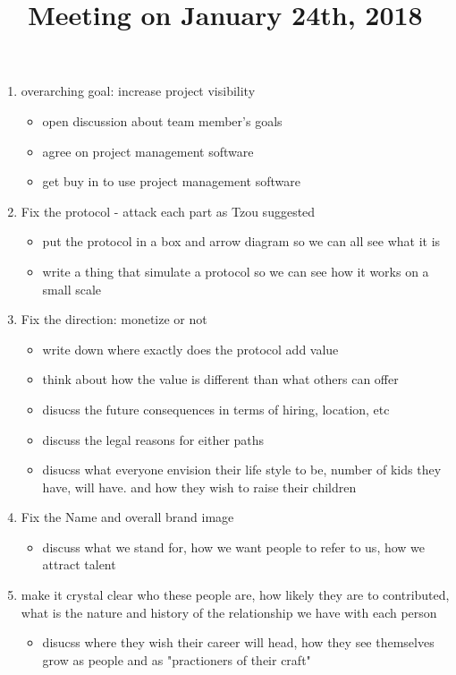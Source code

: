 \title{Meeting on January 24th, 2018}

\begin{enumerate}
	\item overarching goal: increase project visibility
		\begin{itemize}
			\item open discussion about team member's goals
			\item agree on project management software
			\item get buy in to use project management software
		\end{itemize}
	\item Fix the protocol - attack each part as Tzou suggested
		\begin{itemize}
			\item put the protocol in a box and arrow diagram so we can all see what it is
			\item write a thing that simulate a protocol so we can see how it works on a small scale
		\end{itemize}
	\item Fix the direction: monetize or not
		\begin{itemize}
			\item write down where exactly does the protocol add value
			\item think about how the value is different than what others can offer
			\item disucss the future consequences in terms of hiring, location, etc
			\item discuss the legal reasons for either paths
			\item disucss what everyone envision their life style to be, number of kids they have, will have. and how they wish to raise their children
		\end{itemize}
	\item Fix the Name and overall brand image
		\begin{itemize}
			\item discuss what we stand for, how we want people to refer to us, how we attract talent
		\end{itemize}
	\item make it crystal clear who these people are, how likely they are to contributed, what is the nature and history of the relationship we have with each person
		\begin{itemize}
			\item disucss where they wish their career will head, how they see themselves grow as people and as "practioners of their craft"

\end{itemize}
\end{enumerate}
